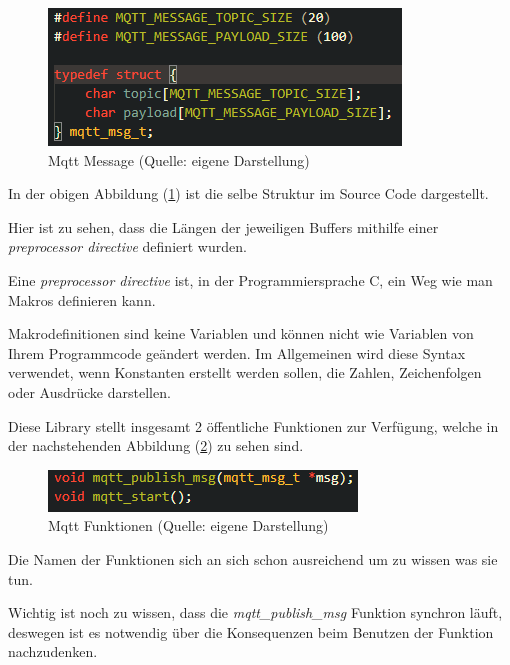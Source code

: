 \begin{figure}[H]
    \begin{center}
        \includegraphics[scale=1]{images/mqtt_msg_t.png}
        \caption{Mqtt Message (Quelle: eigene Darstellung)}
        \label{abb:mqtt_msg_t}
    \end{center}
\end{figure}

In der obigen Abbildung (\ref{abb:mqtt_msg_t}) ist die selbe Struktur im Source Code dargestellt.

Hier ist zu sehen, dass die Längen der jeweiligen Buffers mithilfe einer \textit{preprocessor directive} definiert wurden. 

Eine \textit{preprocessor directive} ist, in der Programmiersprache C, ein Weg wie man Makros definieren kann. 

Makrodefinitionen sind keine Variablen und können nicht wie Variablen von Ihrem Programmcode geändert werden. Im Allgemeinen wird diese Syntax verwendet, wenn Konstanten erstellt werden sollen, die Zahlen, Zeichenfolgen oder Ausdrücke darstellen.

Diese Library stellt insgesamt 2 öffentliche Funktionen zur Verfügung, welche in der nachstehenden Abbildung (\ref{abb:mqtt_functions}) zu sehen sind.

\begin{figure}[H]
    \begin{center}
        \includegraphics[scale=1]{images/mqtt_functions.png}
        \caption{Mqtt Funktionen (Quelle: eigene Darstellung)}
        \label{abb:mqtt_functions}
    \end{center}
\end{figure}

Die Namen der Funktionen sich an sich schon ausreichend um zu wissen was sie tun.

Wichtig ist noch zu wissen, dass die \textit{mqtt\_publish\_msg} Funktion synchron läuft, deswegen ist es notwendig über die Konsequenzen beim Benutzen der Funktion nachzudenken.

